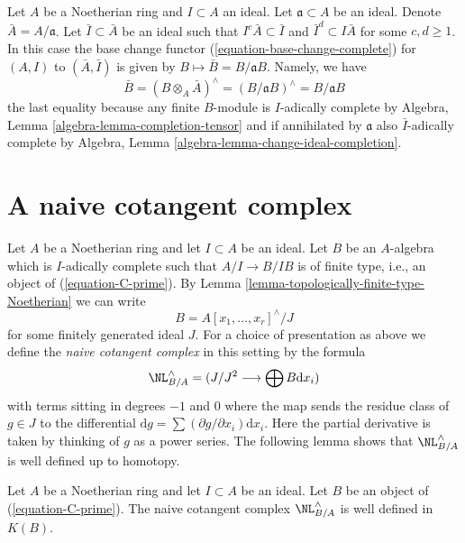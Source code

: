 \begin{remark}
\label{remark-take-bar}
Let $A$ be a Noetherian ring and $I \subset A$ an ideal.
Let $\mathfrak a \subset A$ be an ideal. Denote $\bar A = A/\mathfrak a$.
Let $\bar I \subset \bar A$ be an ideal such that
$I^c \bar A \subset \bar I$ and $\bar I^d \subset I\bar A$
for some $c, d \geq 1$. In this case the base change functor
(\ref{equation-base-change-complete}) for $(A, I)$ to $(\bar A, \bar I)$
is given by $B \mapsto \bar B = B/\mathfrak aB$. Namely, we have
\begin{equation}
\label{equation-base-change-to-closed}
\bar B = (B \otimes_A \bar A)^\wedge = (B/\mathfrak a B)^\wedge =
B/\mathfrak a B
\end{equation}
the last equality because any finite $B$-module is $I$-adically complete by
Algebra, Lemma \ref{algebra-lemma-completion-tensor}
and if annihilated by $\mathfrak a$ also $\bar I$-adically complete by
Algebra, Lemma \ref{algebra-lemma-change-ideal-completion}.
\end{remark}







\section{A naive cotangent complex}
\label{section-naive-cotangent-complex}

\noindent
Let $A$ be a Noetherian ring and let $I \subset A$ be an ideal.
Let $B$ be an $A$-algebra which is $I$-adically complete such
that $A/I \to B/IB$ is of finite type, i.e., an object of
(\ref{equation-C-prime}).
By Lemma \ref{lemma-topologically-finite-type-Noetherian} we can write
$$
B = A[x_1, \ldots, x_r]^\wedge / J
$$
for some finitely generated ideal $J$. For a choice of presentation as
above we define the {\it naive cotangent complex}
in this setting by the formula
\begin{equation}
\label{equation-NL}
\NL_{B/A}^\wedge = (J/J^2 \longrightarrow \bigoplus B\text{d}x_i)
\end{equation}
with terms sitting in degrees $-1$ and $0$
where the map sends the residue class of $g \in J$ to the differential
$\text{d}g = \sum (\partial g/\partial x_i) \text{d}x_i$. Here
the partial derivative is taken by thinking of $g$ as a power series.
The following lemma shows that $\NL_{B/A}^\wedge$ is well defined
up to homotopy.

\begin{lemma}
\label{lemma-NL-up-to-homotopy}
Let $A$ be a Noetherian ring and let $I \subset A$ be an ideal.
Let $B$ be an object of (\ref{equation-C-prime}). The naive
cotangent complex $\NL_{B/A}^\wedge$ is well defined in $K(B)$.
\end{lemma}

